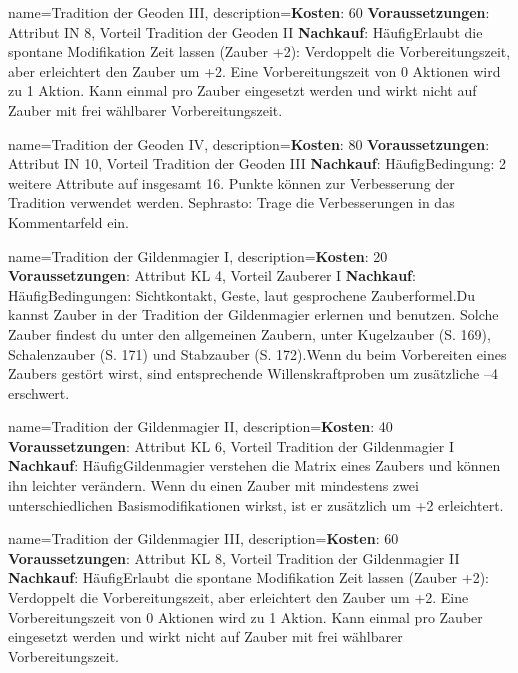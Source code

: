 {
    name={Tradition der Geoden III},
    description={\textbf{Kosten}: 60 \textbf{Voraussetzungen}: Attribut IN 8, Vorteil Tradition der Geoden II \textbf{Nachkauf}: Häufig\newline Erlaubt die spontane Modifikation Zeit lassen (Zauber +2): Verdoppelt die Vorbereitungszeit, aber erleichtert den Zauber um +2. Eine Vorbereitungszeit von 0 Aktionen wird zu 1 Aktion. Kann einmal pro Zauber eingesetzt werden und wirkt nicht auf Zauber mit frei wählbarer Vorbereitungszeit.}
}


{
    name={Tradition der Geoden IV},
    description={\textbf{Kosten}: 80 \textbf{Voraussetzungen}: Attribut IN 10, Vorteil Tradition der Geoden III \textbf{Nachkauf}: Häufig\newline Bedingung: 2 weitere Attribute auf insgesamt 16. Punkte können zur Verbesserung der Tradition verwendet werden. Sephrasto: Trage die Verbesserungen in das Kommentarfeld ein.}
}


{
    name={Tradition der Gildenmagier I},
    description={\textbf{Kosten}: 20 \textbf{Voraussetzungen}: Attribut KL 4, Vorteil Zauberer I \textbf{Nachkauf}: Häufig\newline Bedingungen: Sichtkontakt, Geste, laut gesprochene Zauberformel.\newline Du kannst Zauber in der Tradition der Gildenmagier erlernen und benutzen. Solche Zauber findest du unter den allgemeinen Zaubern, unter Kugelzauber (S. 169), Schalenzauber (S. 171) und Stabzauber (S. 172).\newline Wenn du beim Vorbereiten eines Zaubers gestört wirst, sind entsprechende Willenskraftproben um zusätzliche –4 erschwert.}
}


{
    name={Tradition der Gildenmagier II},
    description={\textbf{Kosten}: 40 \textbf{Voraussetzungen}: Attribut KL 6, Vorteil Tradition der Gildenmagier I \textbf{Nachkauf}: Häufig\newline Gildenmagier verstehen die Matrix eines Zaubers und können ihn leichter verändern. Wenn du einen Zauber mit mindestens zwei unterschiedlichen Basismodifikationen wirkst, ist er zusätzlich um +2 erleichtert.}
}


{
    name={Tradition der Gildenmagier III},
    description={\textbf{Kosten}: 60 \textbf{Voraussetzungen}: Attribut KL 8, Vorteil Tradition der Gildenmagier II \textbf{Nachkauf}: Häufig\newline Erlaubt die spontane Modifikation Zeit lassen (Zauber +2): Verdoppelt die Vorbereitungszeit, aber erleichtert den Zauber um +2. Eine Vorbereitungszeit von 0 Aktionen wird zu 1 Aktion. Kann einmal pro Zauber eingesetzt werden und wirkt nicht auf Zauber mit frei wählbarer Vorbereitungszeit.}
}


